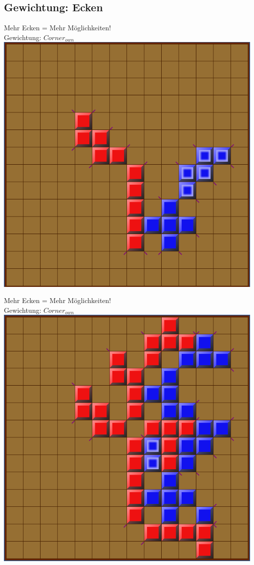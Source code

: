\documentclass[12pt, draft]{beamer}
\begin{document}
\subsection{Gewichtung: Ecken}
\begin{frame}
	Mehr Ecken = Mehr Möglichkeiten!\\
	\pause
	Gewichtung: $Corner_{own}$\\
	\pause
	\includegraphics[width=0.6\linewidth]{media/wgh2.png}
\end{frame}
\begin{frame}
	Mehr Ecken = Mehr Möglichkeiten!\\
	Gewichtung: $Corner_{own}$\\
	\includegraphics[width=0.6\linewidth]{media/wgh3.png}
\end{frame}
\end{document}
